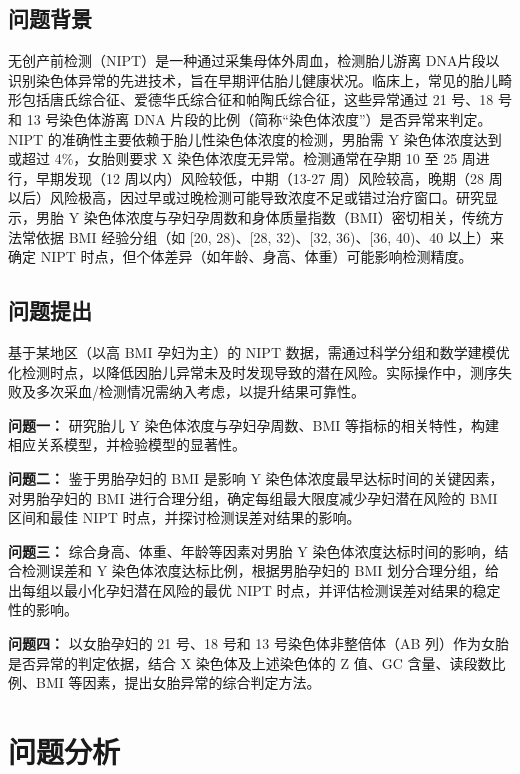 \documentclass[withoutpreface,bwprint]{cumcmthesis} %
\begin{document}
\subsection{问题背景}

无创产前检测（NIPT）是一种通过采集母体外周血，检测胎儿游离 DNA片段以识别染色体异常的先进技术，旨在早期评估胎儿健康状况。临床上，常见的胎儿畸形包括唐氏综合征、爱德华氏综合征和帕陶氏综合征，这些异常通过 21 号、18 号和 13 号染色体游离 DNA 片段的比例（简称“染色体浓度”）是否异常来判定。NIPT 的准确性主要依赖于胎儿性染色体浓度的检测，男胎需 Y 染色体浓度达到或超过 4\%，女胎则要求 X 染色体浓度无异常。检测通常在孕期 10 至 25 周进行，早期发现（12 周以内）风险较低，中期（13-27 周）风险较高，晚期（28 周以后）风险极高，因过早或过晚检测可能导致浓度不足或错过治疗窗口。研究显示，男胎 Y 染色体浓度与孕妇孕周数和身体质量指数（BMI）密切相关，传统方法常依据 BMI 经验分组（如 [20, 28)、[28, 32)、[32, 36)、[36, 40)、40 以上）来确定 NIPT 时点，但个体差异（如年龄、身高、体重）可能影响检测精度。

\subsection{问题提出}
基于某地区（以高 BMI 孕妇为主）的 NIPT 数据，需通过科学分组和数学建模优化检测时点，以降低因胎儿异常未及时发现导致的潜在风险。实际操作中，测序失败及多次采血/检测情况需纳入考虑，以提升结果可靠性。

\textbf{问题一：}
研究胎儿 Y 染色体浓度与孕妇孕周数、BMI 等指标的相关特性，构建相应关系模型，并检验模型的显著性。

\textbf{问题二：}
鉴于男胎孕妇的 BMI 是影响 Y 染色体浓度最早达标时间的关键因素，对男胎孕妇的 BMI 进行合理分组，确定每组最大限度减少孕妇潜在风险的 BMI 区间和最佳 NIPT 时点，并探讨检测误差对结果的影响。

\textbf{问题三：}
综合身高、体重、年龄等因素对男胎 Y 染色体浓度达标时间的影响，结合检测误差和 Y 染色体浓度达标比例，根据男胎孕妇的 BMI 划分合理分组，给出每组以最小化孕妇潜在风险的最优 NIPT 时点，并评估检测误差对结果的稳定性的影响。

\textbf{问题四：}
以女胎孕妇的 21 号、18 号和 13 号染色体非整倍体（AB 列）作为女胎是否异常的判定依据，结合 X 染色体及上述染色体的 Z 值、GC 含量、读段数比例、BMI 等因素，提出女胎异常的综合判定方法。



\section{问题分析}
\end{document}
